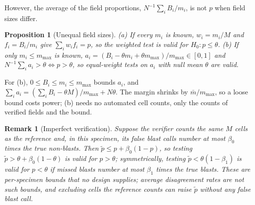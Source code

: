 \documentclass[journal]{IEEEtran}
\newtheorem{proposition}{Proposition}
\newtheorem{remark}{Remark}
\begin{document}
However, the average of the field proportions, $N^{-1}\sum_iB_i/m_i$, is not $p$ when field sizes differ.
\begin{proposition}[Unequal field sizes]\label{prop:unequal}
(a) If every $m_i$ is known, $w_i=m_i/M$ and $f_i=B_i/m_i$ give $\sum_iw_if_i=p$, so the weighted test is valid for $H_0:p\le\theta$. (b) If only $m_i\le m_{\max}$ is known, $a_i=(B_i-\theta m_i+\theta m_{\max})/m_{\max}\in[0,1]$ and $N^{-1}\sum_ia_i>\theta\iff p>\theta$, so equal-weight tests on $a_i$ with null mean $\theta$ are valid.
\end{proposition}
For (b), $0\le B_i\le m_i\le m_{\max}$ bounds $a_i$, and $\sum_ia_i=(\sum_iB_i-\theta M)/m_{\max}+N\theta$. The margin shrinks by $\bar m/m_{\max}$, so a loose bound costs power; (b) needs no automated cell counts, only the counts of verified fields and the bound.
\begin{remark}[Imperfect verification]\label{rem:verif}
Suppose the verifier counts the same $M$ cells as the reference and, in this specimen, its false blast calls number at most $\beta_0$ times the true non-blasts. Then $\tilde p\le p+\beta_0(1-p)$, so testing $\tilde p>\theta+\beta_0(1-\theta)$ is valid for $p>\theta$; symmetrically, testing $\tilde p<\theta(1-\beta_1)$ is valid for $p<\theta$ if missed blasts number at most $\beta_1$ times the true blasts. These are per-specimen bounds that no design supplies; average disagreement rates are not such bounds, and excluding cells the reference counts can raise $\tilde p$ without any false blast call.
\end{remark}
\end{document}
